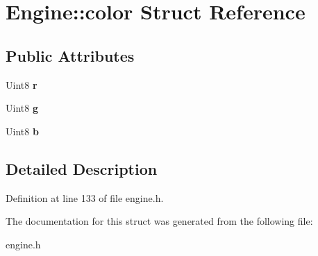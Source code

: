 \hypertarget{structEngine_1_1color}{}\section{Engine\+:\+:color Struct Reference}
\label{structEngine_1_1color}
\subsection*{Public Attributes}
\begin{DoxyCompactItemize}
\item 
Uint8 {\bfseries r}\hypertarget{structEngine_1_1color_ad2f4cb4cb1d9b251100bd1a4ebfa6b1e}{}\label{structEngine_1_1color_ad2f4cb4cb1d9b251100bd1a4ebfa6b1e}

\item 
Uint8 {\bfseries g}\hypertarget{structEngine_1_1color_a3e4b52509fd71e8551d297cd87073af4}{}\label{structEngine_1_1color_a3e4b52509fd71e8551d297cd87073af4}

\item 
Uint8 {\bfseries b}\hypertarget{structEngine_1_1color_a2c684bfdca0608a79500f714671b97e9}{}\label{structEngine_1_1color_a2c684bfdca0608a79500f714671b97e9}

\end{DoxyCompactItemize}


\subsection{Detailed Description}


Definition at line 133 of file engine.\+h.



The documentation for this struct was generated from the following file\+:\begin{DoxyCompactItemize}
\item 
engine.\+h\end{DoxyCompactItemize}
